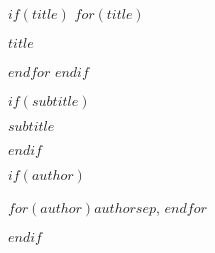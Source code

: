 \begin{titlepage}
    \begin{center}
        \vspace*{2.5cm}

        $if(title)$
            $for(title)$
                {\LARGE\bfseries $title$ \par}
            $endfor$
            \vspace{1.5cm}
        $endif$


        $if(subtitle)$
            {\scshape\large\bfseries $subtitle$ \par}
            \vspace{1.5cm}
        $endif$
        

        $if(author)$
            {\scshape\normalsize $for(author)$$author$$sep$, $endfor$ \par}
        $endif$


      \end{center}
\end{titlepage}
